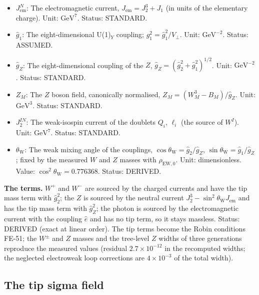 \documentclass[
  10pt,
]{article}
\begin{document}
\begin{itemize}
  \(\hat e = \hat g_2\hat g_1/\hat g_Z\) (\(e^2 = \hat e^2/V_\perp\)).
  Unit: \(\mathrm{GeV}^{-2}\). Status: STANDARD.
\item
  \(J_{\mathrm{em}}^N\): The electromagnetic current,
  \(J_{\mathrm{em}} = J_2^3 + J_1\) (in units of the elementary charge).
  Unit: \(\mathrm{GeV}^{7}\). Status: STANDARD.
\item
  \(\hat g_1\): The eight-dimensional U(1)\(_Y\) coupling;
  \(g_1^2 = \hat g_1^2/V_\perp\). Unit: \(\mathrm{GeV}^{-2}\). Status:
  ASSUMED.
\item
  \(\hat g_Z\): The eight-dimensional coupling of the \(Z\),
  \(\hat g_Z = (\hat g_2^2 + \hat g_1^2)^{1/2}\). Unit:
  \(\mathrm{GeV}^{-2}\). Status: STANDARD.
\item
  \(Z_M\): The \(Z\) boson field, canonically normalised,
  \(Z_M = (W^3_M - B_M)/\hat g_Z\). Unit: \(\mathrm{GeV}^{3}\). Status:
  STANDARD.
\item
  \(J_2^{IN}\): The weak-isospin current of the doublets \(Q_i\),
  \(\ell_i\) (the source of \(W^I\)). Unit: \(\mathrm{GeV}^{7}\).
  Status: STANDARD.
\item
  \(\theta_{\mathrm{W}}\): The weak mixing angle of the couplings,
  \(\cos\theta_{\mathrm{W}} = \hat g_2/\hat g_Z\),
  \(\sin\theta_{\mathrm{W}} = \hat g_1/\hat g_Z\); fixed by the measured
  \(W\) and \(Z\) masses with \(\rho_{\mathrm{EW},0}\). Unit:
  dimensionless. Value: \(\cos^2\theta_{\mathrm{W}} = 0.776368\).
  Status: DERIVED.
\end{itemize}

\textbf{The terms.} \(W^+\) and \(W^-\) are sourced by the charged
currents and have the tip mass term with \(\hat g_2^2\); the \(Z\) is
sourced by the neutral current
\(J_2^3 - \sin^2\theta_{\mathrm{W}}J_{\mathrm{em}}\) and has the tip
mass term with \(\hat g_Z^2\); the photon is sourced by the
electromagnetic current with the coupling \(\hat e\) and has no tip
term, so it stays massless. Status: DERIVED (exact at linear order). The
tip terms become the Robin conditions FE-51; the \(W^\pm\) and \(Z\)
masses and the tree-level \(Z\) widths of three generations reproduce
the measured values (residual \(2.7\times10^{-12}\) in the recomputed
widths; the neglected electroweak loop corrections are
\(4\times10^{-3}\) of the total width).

\hypertarget{the-tip-sigma-field}{%
\subsection{The tip sigma field}\label{the-tip-sigma-field}}
\end{document}
